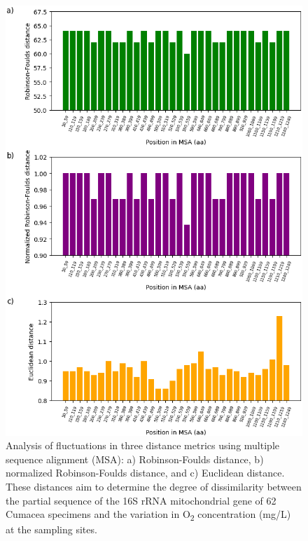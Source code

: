 \begin{figure}[htbp]
    \centering
    \includegraphics[width=\textwidth]{figure6.png}
    \caption{Analysis of fluctuations in three distance metrics using multiple sequence alignment (MSA): a) Robinson-Foulds distance, b) normalized Robinson-Foulds distance, and c) Euclidean distance. These distances aim to determine the degree of dissimilarity between the partial sequence of the 16S rRNA mitochondrial gene of 62 Cumacea specimens and the variation in O\textsubscript{2} concentration (mg/L) at the sampling sites. \label{fig:fig8}}
\end{figure}

